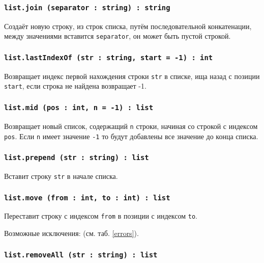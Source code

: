 \subsubsection{\texttt{list.join (separator : string) : string}}

Создаёт новую строку, из строк списка, путём последовательной конкатенации, между значениями вставится \texttt{separator}, он может быть пустой строкой.

\subsubsection{\texttt{list.lastIndexOf (str : string, start = -1) : int}}

Возвращает индекс первой нахождения строки \texttt{str} в списке, ища назад с позиции \texttt{start}, если строка не найдена возвращает -1.

\subsubsection{\texttt{list.mid (pos : int, n = -1) : list}}

Возвращает новый список, содержащий \texttt{n} строки, начиная со строкой с индексом \texttt{pos}. Если \texttt{n} имеет значение \texttt{-1} то будут добавлены все значение до конца списка.

\subsubsection{\texttt{list.prepend (str : string) : list}}

Вставит строку \texttt{str} в начале списка.

\subsubsection{\texttt{list.move (from : int, to : int) : list}}

Переставит строку с индексом \texttt{from} в позиции с индексом \texttt{to}.

Возможные исключения:  (см. таб. \ref{errors}).

\subsubsection{\texttt{list.removeAll (str : string) : list}}

